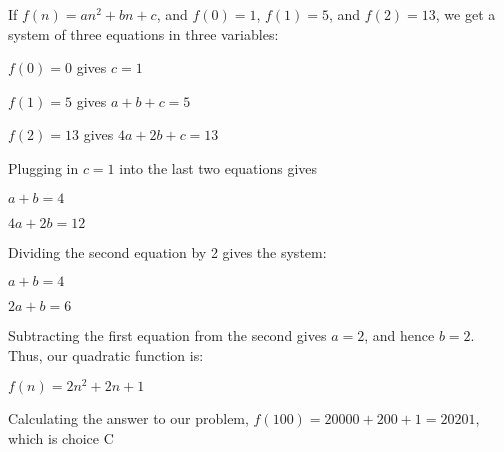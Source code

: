 If $f(n) = an^2 + bn + c$, and $f(0) = 1$, $f(1) = 5$, and $f(2) = 13$, we get a system of three equations in three variables:

$f(0) = 0$ gives $c = 1$

$f(1) = 5$ gives $a + b + c = 5$

$f(2) = 13$ gives $4a + 2b + c = 13$

Plugging in $c=1$ into the last two equations gives

$a + b = 4$

$4a + 2b = 12$

Dividing the second equation by 2 gives the system:

$a + b = 4$

$2a + b = 6$

Subtracting the first equation from the second gives $a = 2$, and hence $b = 2$. Thus, our quadratic function is:

$f(n) = 2n^2 + 2n + 1$

Calculating the answer to our problem, $f(100) = 20000 + 200 + 1 = 20201$, which is choice $\boxed{\text{C}}$
